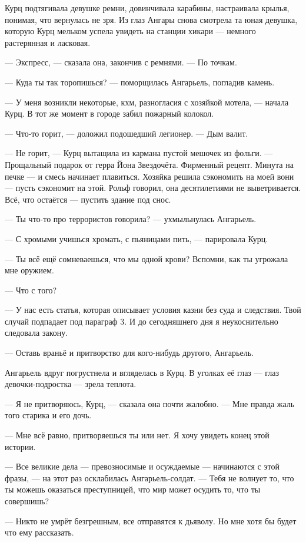 Курц подтягивала девушке ремни, довинчивала карабины, настраивала крылья, понимая, что вернулась не зря.
Из глаз Ангары снова смотрела та юная девушка, которую Курц мельком успела увидеть на станции хикари --- немного растерянная и ласковая.

--- Экспресс, --- сказала она, закончив с ремнями.
--- По точкам.

--- Куда ты так торопишься? --- поморщилась Ангарьель, погладив камень.

--- У меня возникли некоторые, кхм, разногласия с хозяйкой мотела, --- начала Курц.
В тот же момент в городе забил пожарный колокол.

--- Что-то горит, --- доложил подошедший легионер.
--- Дым валит.

--- Не горит, --- Курц вытащила из кармана пустой мешочек из фольги.
--- Прощальный подарок от герра Йона Звездочёта.
Фирменный рецепт.
Минута на печке --- и смесь начинает плавиться.
Хозяйка решила сэкономить на моей вони --- пусть сэкономит на этой.
Рольф говорил, она десятилетиями не выветривается.
Всё, что остаётся --- пустить здание под снос.

--- Ты что-то про террористов говорила? --- ухмыльнулась Ангарьель.

--- С хромыми учишься хромать, с пьяницами пить, --- парировала Курц.

--- Ты всё ещё сомневаешься, что мы одной крови?
Вспомни, как ты угрожала мне оружием.

--- Что с того?

--- У нас есть статья, которая описывает условия казни без суда и следствия.
Твой случай подпадает под параграф 3.
И до сегодняшнего дня я неукоснительно следовала закону.

--- Оставь враньё и притворство для кого-нибудь другого, Ангарьель.

Ангарьель вдруг погрустнела и вгляделась в Курц.
В уголках её глаз --- глаз девочки-подростка --- зрела теплота.

--- Я не притворяюсь, Курц, --- сказала она почти жалобно.
--- Мне правда жаль того старика и его дочь.

--- Мне всё равно, притворяешься ты или нет.
Я хочу увидеть конец этой истории.

--- Все великие дела --- превозносимые и осуждаемые --- начинаются с этой фразы, --- на этот раз осклабилась Ангарьель-солдат.
--- Тебя не волнует то, что ты можешь оказаться преступницей, что мир может осудить то, что ты совершишь?

--- Никто не умрёт безгрешным, все отправятся к дьяволу.
Но мне хотя бы будет что ему рассказать.


